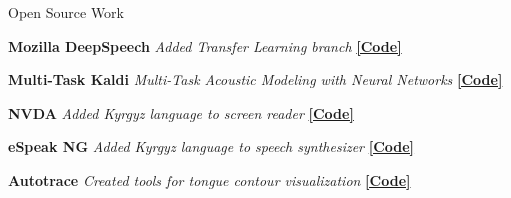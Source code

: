 \documentclass{resume} %
\begin{document}
\vspace{.25cm}

\begin{rSection}{Open Source Work}

{\textbf{Mozilla DeepSpeech}} {\hfill \textit{Added Transfer Learning branch} {\hspace{2.5cm} \href{https://github.com/mozilla/DeepSpeech/tree/transfer-learning}{\textbf{[Code]}}}} \\\vspace{-.35cm}

{\textbf{Multi-Task Kaldi}} {\hfill \textit{Multi-Task Acoustic Modeling with Neural Networks} {\hspace{2.5cm} \href{https://github.com/JRMeyer/multi-task-kaldi}{\textbf{[Code]}}}} \\\vspace{-.35cm}

{\textbf{NVDA}} {\hfill \textit{Added Kyrgyz language to screen reader} {\hspace{2.5cm} \href{https://github.com/JRMeyer/nvda}{\textbf{[Code]}}}} \\\vspace{-.35cm}

{\textbf{eSpeak NG}} {\hfill \textit{Added Kyrgyz language to speech synthesizer} {\hspace{2.5cm} \href{https://github.com/rhdunn/espeak/commits?author=JRMeyer}{\textbf{[Code]}}}}\\\vspace{-.35cm}

{\textbf{Autotrace}} {\hfill \textit{Created tools for tongue contour visualization} {\hspace{2.5cm} \href{https://github.com/JRMeyer/Autotrace}{\textbf{[Code]}}}} \\
\end{rSection}



\vspace{.25cm}
\end{document}
